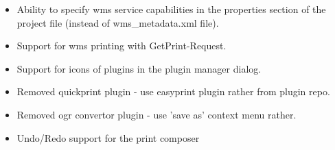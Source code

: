 
\begin{itemize}[label=--]
\item Ability to specify wms service capabilities in the properties section of the project file (instead of wms\_metadata.xml file).
\item Support for wms printing with GetPrint-Request.
\end{itemize}


\begin{itemize}[label=--]
\item Support for icons of plugins in the plugin manager dialog.
\item Removed quickprint plugin - use easyprint plugin rather from plugin repo.
\item Removed ogr convertor plugin - use 'save as' context menu rather.
\end{itemize}


\begin{itemize}[label=--]
\item Undo/Redo support for the print composer
\end{itemize}

\newpage

